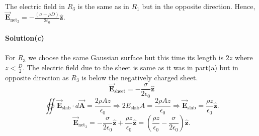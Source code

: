 \documentclass{article}
\begin{document}
\\The electric field in $R_3$ is the same as in $R_1$ but in the opposite direction. Hence, $\Vec{\boldsymbol{E}}_{\text{net}_2}=-\frac{(\sigma+\rho D)}{2\epsilon_0}\boldsymbol{\hat{z}}.$
\\
\\\textbf{Solution(c)}
\\
\\For $R_3$ we choose the same Gaussian surface but this time its length is $2z$ where $z<\frac{D}{2}$. The electric field due to the sheet is same as it was in part(a) but in opposite direction as $R_3$ is below the negatively charged sheet.
\[\Vec{\boldsymbol{E}}_{\text{sheet}}=-\frac{\sigma}{2\epsilon_0}\boldsymbol{\hat{z}}\]
\[\oiint\Vec{\boldsymbol{E}}_{\text{slab}}\cdot d\Vec{\boldsymbol{A}}=\frac{2\rho Az}{\epsilon_0}\Rightarrow2E_{\text{slab}}A=\frac{2\rho Az}{\epsilon_0}\Rightarrow\Vec{\boldsymbol{E}}_{\text{slab}}=\frac{\rho z}{\epsilon_0}\boldsymbol{\hat{z}}.\]
\[\Vec{\boldsymbol{E}}_{\text{net}_3}=-\frac{\sigma}{2\epsilon_0}\boldsymbol{\hat{z}}+\frac{\rho z}{\epsilon_0}\boldsymbol{\hat{z}}=\left(\frac{\rho z}{\epsilon_0}-\frac{\sigma}{2\epsilon_0}\right)\boldsymbol{\hat{z}}.\]
\end{document}
